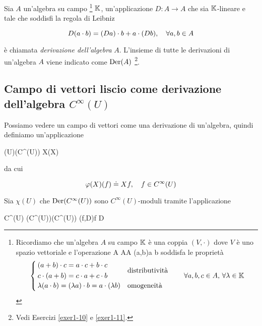 Sia $ A $ un'algebra su campo
	\footnote{%
		Ricordiamo che un'algebra $ A $ su campo $ \mathbb{K} $ è una coppia $ (V, \cdot) $ dove $ V $ è uno spazio vettoriale e l'operazione
		\maps{\cdot}
			{A \times A}{A}
			{(a,b)}{a \cdot b}
		soddisfa le proprietà
		\begin{equation*}
			\begin{cases}
				\begin{split}
					(a + b) \cdot c = a \cdot c + b \cdot c \\
					c \cdot (a + b) = c \cdot a + c \cdot b
				\end{split} & \text{distributività} \\
				\lambda (a \cdot b) = (\lambda a) \cdot b = a \cdot (\lambda b) & \text{omogeneità}
			\end{cases} %
			\qquad \forall a,b,c \in A, \, \forall \lambda \in \K
		\end{equation*} %
} $ \mathbb{K} $, un'applicazione $ D : A \to A $ che sia $ \mathbb{K} $-lineare e tale che soddisfi la regola di Leibniz

\begin{equation}
	D (a \cdot b) = (D a) \cdot b + a \cdot (D b) \qcomma \forall a, b \in A
\end{equation}

è chiamata \textit{derivazione dell'algebra} $ A $. L'insieme di tutte le derivazioni di un'algebra $ A $ viene indicato come $ \operatorname{Der}(A) $
\footnote{%
	Vedi Esercizi \ref{exer1-10} e \ref{exer1-11}.%
}.

\subsection{Campo di vettori liscio come derivazione dell'algebra $ C^{\infty}(U) $}

Possiamo vedere un campo di vettori come una derivazione di un'algebra, quindi definiamo un'applicazione

\map{\varphi}
	{\chi(U)}{\der(C^{\infty}(U))}
	{X}{\varphi(X)}

da cui

\begin{equation}
	\varphi(X) (f) \doteq X f \qcomma f \in C^{\infty}(U)
\end{equation}

Sia $ \chi(U) $ che $ \operatorname{Der}(C^{\infty}(U)) $ sono $ C^{\infty}(U) $-moduli tramite l'applicazione

\map{\cdot}
	{C^{\infty}(U) \times \der(C^{\infty}(U))}{\der(C^{\infty}(U))}
	{(f,D)}{f D}

